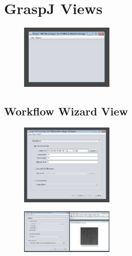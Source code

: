 \documentclass[aspectratio=169]{beamer}
\begin{document}
\section{GraspJ Views}

\begin{frame}

\begin{figure}[h!]
    \centering	\includegraphics[width=0.4\textwidth]{./images/graspj.png} 
    \caption{}
    \label{fig:graspj}
    \end{figure} 
 
\end{frame}

\subsection{Workflow Wizard View}

\begin{frame}
 
 \begin{figure}[h!]
    \centering	\includegraphics[width=0.4\textwidth]{./images/graspj_workflow1.png} 
    \caption{}
    \label{fig:workflow}
    \end{figure} 
 
\end{frame}


\begin{frame}
 
 \begin{figure}[h!]
    \centering	\includegraphics[width=0.4\textwidth]{./images/graspj_workflow2.png} 
    \caption{}
    \label{fig:workflow2}
    \end{figure} 
 
\end{frame}
\end{document}
